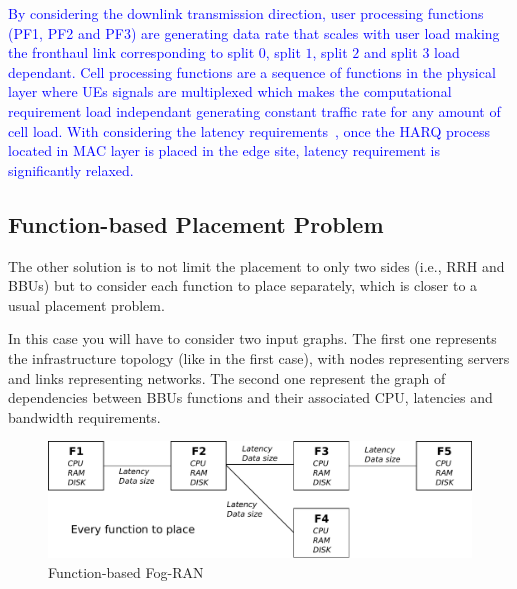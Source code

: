 \documentclass[
    a4paper, 
    12pt, onecolumn,
]{article}
\begin{document}
\textcolor{blue}{
By considering the downlink transmission direction, user processing functions (PF1, PF2 and PF3) are generating data rate that scales with user load making the fronthaul link corresponding to split $0$, split $1$, split $2$ and split $3$ load dependant. Cell processing functions are a sequence of functions in the physical layer where UEs signals are multiplexed which makes the computational requirement load independant generating constant traffic rate for any amount of cell load. With considering the latency requirements~\cite{CITE-008}, once the HARQ process located in MAC layer is placed in the edge site, latency requirement is significantly relaxed.
}
\subsection{Function-based Placement Problem} 
The other solution is to not limit the placement to only two sides (i.e., RRH and BBUs) but to consider each function to place separately, which is closer to a usual placement problem.

In this case you will have to consider two input graphs. The first one represents the infrastructure topology (like in the first case), with nodes representing servers and links representing networks. The second one represent the graph of dependencies between BBUs functions and their associated CPU, latencies and bandwidth requirements.

\begin{figure}[t]
\begin{center}
  \includegraphics[width=\textwidth]{./images/app2.pdf}
  \caption{Function-based Fog-RAN}
  \label{fig:app2}
\end{center}
\end{figure}

\end{document}
